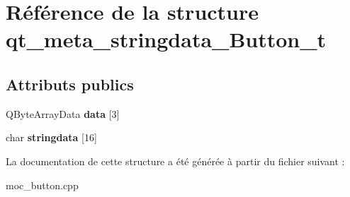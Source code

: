 \hypertarget{structqt__meta__stringdata__Button__t}{\section{Référence de la structure qt\+\_\+meta\+\_\+stringdata\+\_\+\+Button\+\_\+t}
\label{structqt__meta__stringdata__Button__t}
}
\subsection*{Attributs publics}
\begin{DoxyCompactItemize}
\item 
\hypertarget{structqt__meta__stringdata__Button__t_abae7a5635db969addab0ecca7de6b998}{Q\+Byte\+Array\+Data {\bfseries data} \mbox{[}3\mbox{]}}\label{structqt__meta__stringdata__Button__t_abae7a5635db969addab0ecca7de6b998}

\item 
\hypertarget{structqt__meta__stringdata__Button__t_a53ff140432f80319ad49cacdb8b854f3}{char {\bfseries stringdata} \mbox{[}16\mbox{]}}\label{structqt__meta__stringdata__Button__t_a53ff140432f80319ad49cacdb8b854f3}

\end{DoxyCompactItemize}


La documentation de cette structure a été générée à partir du fichier suivant \+:\begin{DoxyCompactItemize}
\item 
moc\+\_\+button.\+cpp\end{DoxyCompactItemize}
